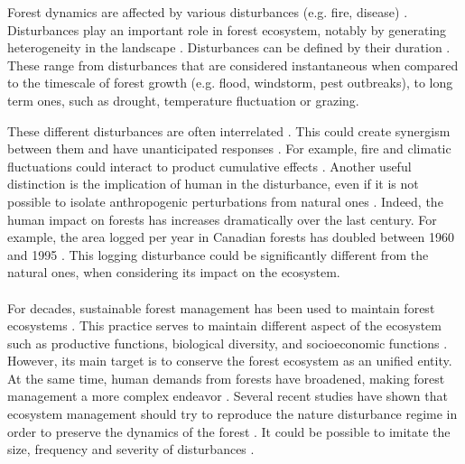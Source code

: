 \documentclass{article}
\begin{document}
Forest dynamics are affected by various disturbances (e.g. fire, disease) \citep{attiwill_disturbance_nodate}. Disturbances play an important role in forest ecosystem, notably by generating heterogeneity in the landscape \citep{turner2010disturbance}. Disturbances can be defined by their duration \citep{perera_simulation_2015}. These range from disturbances that are considered instantaneous when compared to the timescale of forest growth (e.g. flood, windstorm, pest outbreaks), to long term ones, such as drought, temperature fluctuation or grazing.


These different disturbances are often interrelated \citep{keane2015exploring}. This could create synergism between them \citep{mandre_environmental_2011} and have unanticipated responses \citep{perera_simulation_2015}. For example, fire and climatic fluctuations could interact to product cumulative effects \citep{romme_historical_2009}.
Another useful distinction is the implication of human in the disturbance, even if it is not possible to isolate anthropogenic perturbations from natural ones \citep{perera_simulation_2015}.
Indeed, the human impact on forests has increases dramatically over the last century. For example, the area logged per year in Canadian forests has doubled between 1960 and 1995 \citep{smith_canadas_2000}. This logging disturbance could be significantly different from the natural ones, when considering its impact on the ecosystem.

\paragraph{}
For decades, sustainable forest management has been used to maintain forest ecosystems \citep{macdicken_global_2015}. This practice serves to maintain different aspect of the ecosystem such as productive functions, biological diversity, and socioeconomic functions \citep{makela_using_2012}. 
However, its main target is to conserve the forest ecosystem as an unified entity. %
At the same time, human demands from forests have broadened, making forest management a more complex endeavor \citep{eggers_balancing_2017}. Several recent studies have shown that ecosystem management should try to reproduce the nature disturbance regime in order to preserve the dynamics of the forest \citep{bengston_changing_1994, bengtsson_biodiversity_2000}. It could be possible to imitate the size, frequency and severity of disturbances \citep{hunter1988paleoecology, hunter1990wildlife}.
\end{document}
